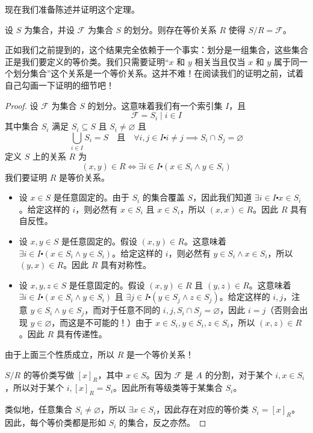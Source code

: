 现在我们准备陈述并证明这个定理。

\begin{theorem}\label{theorem6.4.12}
    设 $S$ 为集合，并设 $\mathcal{F}$ 为集合 $S$ 的划分。则存在等价关系 $R$ 使得 $S/R=\mathcal{F}$。
\end{theorem}

正如我们之前提到的，这个结果完全依赖于一个事实：划分是一组集合，这些集合正是我们要定义的等价类。我们只需要证明``$x$ 和 $y$ 相关当且仅当 $x$ 和 $y$ 属于同一个划分集合''这个关系是一个等价关系。这并不难！在阅读我们的证明之前，试着自己勾画一下证明的细节吧！

\begin{proof}
    设 $\mathcal{F}$ 为集合 $S$ 的划分。这意味着我们有一个索引集 $I$，且
    \[\mathcal{F} = {S_i \mid i \in I}\]
    其中集合 $S_i$ 满足 $S_i \subseteq S$ 且 $S_i \ne \varnothing$ 且
    \[\bigcup_{i \in I} S_i = S \quad \text{且} \quad \forall i, j \in I \centerdot i \ne j \implies S_i \cap S_j = \varnothing\]
    定义 $S$ 上的关系 $R$ 为
    \[(x, y) \in R \iff \exists i \in I \centerdot (x \in S_i \land y \in S_i)\]
    我们要证明 $R$ 是等价关系。

    \begin{itemize}
        \item 设 $x \in S$ 是任意固定的。由于 $S_i$ 的集合覆盖 $S$，因此我们知道 $\exists i \in I \centerdot x \in S_i$。给定这样的 $i$，则必然有 $x \in S_i$ 且 $x \in S_i$，所以 $(x,x) \in R$。因此 $R$ 具有自反性。
        \item 设 $x, y \in S$ 是任意固定的。假设 $(x, y) \in R$。这意味着 $\exists i \in I \centerdot (x \in S_i \land y \in S_i)$。给定这样的 $i$，则必然有 $y \in S_i \land x \in S_i$，所以 $(y,x) \in R$。因此 $R$ 具有对称性。
        \item 设 $x, y, z \in S$ 是任意固定的。假设 $(x, y) \in R$ 且 $(y, z) \in R$。这意味着 $\exists i \in I \centerdot (x \in S_i \land y \in S_i)$ 且 $\exists j \in I \centerdot (y \in S_j \land z \in S_j)$。给定这样的 $i,j$，注意 $y \in S_i \land y \in S_j$，而对于任意不同的 $i,j, S_i \cap S_j = \varnothing$，因此 $i=j$（否则会出现 $y \in \varnothing$，而这是不可能的！）由于 $x \in S_i, y \in S_i, z \in S_i$，所以 $(x,z) \in R$。因此 $R$ 具有传递性。
    \end{itemize}
    由于上面三个性质成立，所以 $R$ 是一个等价关系！

    $S/R$ 的等价类写做 $[x]_R$，其中 $x \in S$。因为 $\mathcal{F}$ 是 $A$ 的分割，对于某个 $i, x \in S_i$，所以对于某个 $i, [x]_R = S_i$。因此所有等级类等于某集合 $S_i$。

    类似地，任意集合 $S_i \ne \varnothing$，所以 $\exists x \in S_i$，因此存在对应的等价类 $S_i=[x]_R$。因此，每个等价类都是形如 $S_i$ 的集合，反之亦然。
\end{proof}

